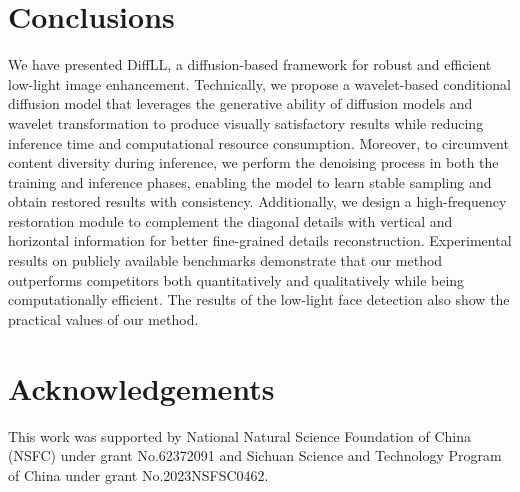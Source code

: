 \section{Conclusions}\label{sec:conclusion}
We have presented DiffLL, a diffusion-based framework for robust and efficient low-light image enhancement. Technically, we propose a wavelet-based conditional diffusion model that leverages the generative ability of diffusion models and wavelet transformation to produce visually satisfactory results while reducing inference time and computational resource consumption. Moreover, to circumvent content diversity during inference, we perform the denoising process in both the training and inference phases, enabling the model to learn stable sampling and obtain restored results with consistency. Additionally, we design a high-frequency restoration module to complement the diagonal details with vertical and horizontal information for better fine-grained details reconstruction. Experimental results on publicly available benchmarks demonstrate that our method outperforms competitors both quantitatively and qualitatively while being computationally efficient. The results of the low-light face detection also show the practical values of our method.

\section*{Acknowledgements}
This work was supported by National Natural Science Foundation of China (NSFC) under grant No.62372091 and Sichuan Science and Technology Program of China under grant No.2023NSFSC0462.



